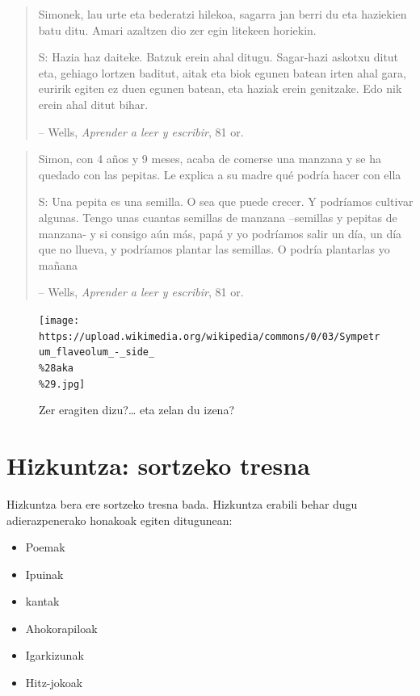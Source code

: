 \documentclass[
]{book}
\providecommand{\tightlist}{%
  \setlength{\itemsep}{0pt}\setlength{\parskip}{0pt}}
\begin{document}
\begin{quote}
Simonek, lau urte eta bederatzi hilekoa, sagarra jan berri du eta haziekien batu ditu. Amari azaltzen dio zer egin litekeen horiekin.

S: Hazia haz daiteke. Batzuk erein ahal ditugu. Sagar-hazi askotxu ditut eta, gehiago lortzen baditut, aitak eta biok egunen batean irten ahal gara, euririk egiten ez duen egunen batean, eta haziak erein genitzake. Edo nik erein ahal ditut bihar.

-- Wells, \emph{Aprender a leer y escribir}, 81 or.
\end{quote}

\begin{quote}
Simon, con 4 años y 9 meses, acaba de comerse una manzana y se ha quedado con las pepitas. Le explica a su madre qué podría hacer con ella

S: Una pepita es una semilla. O sea que puede crecer. Y podríamos cultivar algunas. Tengo unas cuantas semillas de manzana --semillas y pepitas de manzana- y si consigo aún más, papá y yo podríamos salir un día, un día que no llueva, y podríamos plantar las semillas. O podría plantarlas yo mañana

-- Wells, \emph{Aprender a leer y escribir}, 81 or.
\end{quote}

\begin{figure}
\centering
\texttt{[image: https://upload.wikimedia.org/wikipedia/commons/0/03/Sympetrum\_flaveolum\_-\_side\_\\\%28aka\\\%29.jpg]}
\caption{Zer eragiten dizu?\ldots{} eta zelan du izena?}
\end{figure}

\hypertarget{hizkuntza-sortzeko-tresna}{%
\section{Hizkuntza: sortzeko tresna}\label{hizkuntza-sortzeko-tresna}}

Hizkuntza bera ere sortzeko tresna bada. Hizkuntza erabili behar dugu adierazpenerako honakoak egiten ditugunean:

\begin{itemize}
\tightlist
\item
  Poemak
\item
  Ipuinak
\item
  kantak
\item
  Ahokorapiloak
\item
  Igarkizunak
\item
  Hitz-jokoak
\end{itemize}
\end{document}
